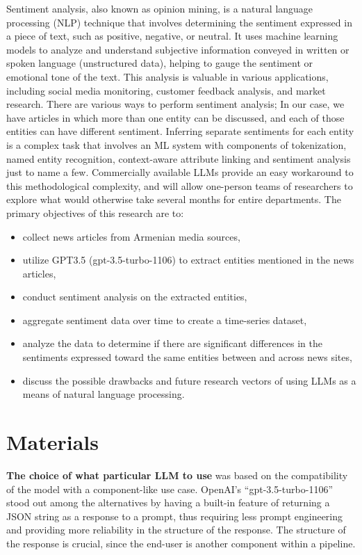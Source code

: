 \documentclass{IEEEtran}
\begin{document}
Sentiment analysis, also known as opinion mining, is a natural language processing (NLP) technique that involves determining the sentiment expressed in a piece of text, such as positive, negative, or neutral. It uses machine learning models to analyze and understand subjective information conveyed in written or spoken language (unstructured data), helping to gauge the sentiment or emotional tone of the text. This analysis is valuable in various applications, including social media monitoring, customer feedback analysis, and market research. There are various ways to perform sentiment analysis; In our case, we have articles in which more than one entity can be discussed, and each of those entities can have different sentiment. Inferring separate sentiments for each entity is a complex task that involves an ML system with components of tokenization, named entity recognition, context-aware attribute linking and sentiment analysis just to name a few. Commercially available LLMs provide an easy workaround to this methodological complexity, and will allow one-person teams of researchers to explore what would otherwise take several months for entire departments.
\newline
\newline
The primary objectives of this research are to:
\begin{itemize}
    \item collect news articles from Armenian media sources,
    \item utilize GPT3.5 (gpt-3.5-turbo-1106) to extract entities mentioned in the news articles,
    \item conduct sentiment analysis on the extracted entities,
    \item aggregate sentiment data over time to create a time-series dataset,
    \item analyze the data to determine if there are significant differences in the sentiments expressed toward the same entities between and across news sites,
    \item discuss the possible drawbacks and future research vectors of using LLMs as a means of natural language processing.
\end{itemize}



\section{Materials}
\textbf{The choice of what particular LLM to use} was based on the compatibility of the model with a component-like use case. OpenAI’s “gpt-3.5-turbo-1106” stood out among the alternatives by having a built-in feature of returning a JSON string as a response to a prompt, thus requiring less prompt engineering and providing more reliability in the structure of the response. The structure of the response is crucial, since the end-user is another component within a pipeline.
\end{document}
